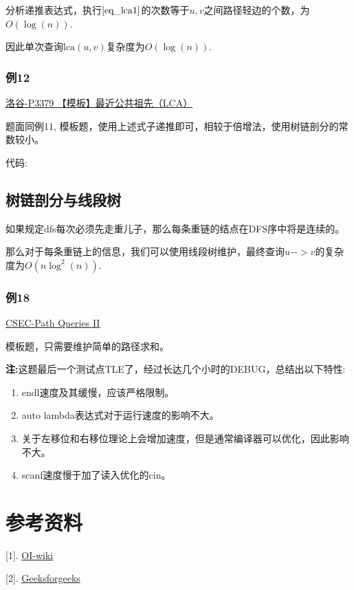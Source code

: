 \documentclass{article}
\newcommand{\lca}{\text{lca}}
\newcommand{\inputcppfile}[1]{}
\begin{document}
分析递推表达式，执行$\ref{eq_lca1}$的次数等于$u,v$之间路径轻边的个数，为$O(\log(n))$.

因此单次查询$\lca(u,v)$复杂度为$O(\log(n))$.

\subsubsection{例12}
\href{https://www.luogu.com.cn/problem/P3379}{洛谷-P3379 【模板】最近公共祖先（LCA）}

题面同例11, 模板题，使用上述式子递推即可，相较于倍增法，使用树链剖分的常数较小。

代码:
\inputcppfile{Code_12.cpp}

\subsection{树链剖分与线段树}

如果规定dfs每次必须先走重儿子，那么每条重链的结点在DFS序中将是连续的。

那么对于每条重链上的信息，我们可以使用线段树维护，最终查询$u->v$的复杂度为$O(n\log^2(n))$.

\subsubsection{例18}
\href{https://cses.fi/problemset/task/2134/}{CSEC-Path Queries II}

模板题，只需要维护简单的路径求和。

\textbf{注:}这题最后一个测试点TLE了，经过长达几个小时的DEBUG，总结出以下特性:

\begin{enumerate}
    \item endl速度及其缓慢，应该严格限制。
    \item auto lambda表达式对于运行速度的影响不大。
    \item 关于左移位和右移位理论上会增加速度，但是通常编译器可以优化，因此影响不大。
    \item scanf速度慢于加了读入优化的cin。
\end{enumerate}

\inputcppfile{Code_18.cpp}

\section{参考资料}
 [1]. \href{https://oi-wiki.org/graph/tree-diameter/}{OI-wiki}

[2]. \href{https://www.geeksforgeeks.org/diameter-of-a-binary-tree/}{Geeksforgeeks}
\end{document}
